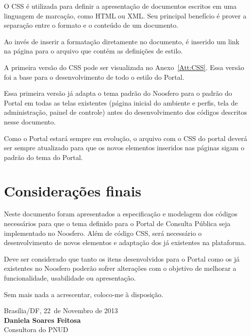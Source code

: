 \documentclass[[a4paper,11pt]{article}
\newcommand{\MyName}{Daniela Soares Feitosa}
\newcommand{\MesEntrega}{Novembro de 2013}
\newcommand{\DiaEntrega}{22}
\begin{document}
O CSS é utilizada para definir a apresentação de documentos escritos em
uma linguagem de marcação, como HTML ou XML. Seu principal benefício é
prover a separação entre o formato e o conteúdo de um documento.

Ao invés de inserir a formatação diretamente no documento, é inserido
um link na página para o arquivo que contém as definições de estilo.

A primeira versão do CSS pode ser visualizada no
Anexo~\ref{Att:CSS}. Essa versão foi a base para o
desenvolvimento de todo o estilo do Portal.

Essa primeira versão já adapta o tema padrão do Noosfero para o padrão
do Portal em todas as telas existentes (página inicial do ambiente e
perfis, tela de administração, painel de controle) antes do desenvolvimento dos
códigos descritos nesse documento.

Como o Portal estará sempre em evolução, o arquivo com o CSS do
portal deverá ser sempre atualizado para que os novos elementos
inseridos nas páginas sigam o padrão do tema do Portal.

\newpage

\section{Considerações finais}

Neste documento foram apresentados a especificação e modelagem
dos
códigos necessários para que o tema definido para o Portal de Consulta
Pública seja implementado no Noosfero. Além de código CSS, será
necessário o desenvolvimento de novos elementos e adaptação dos
já existentes na plataforma.

Deve ser considerado que tanto os itens
desenvolvidos para o Portal como os já existentes no Noosfero
poderão sofrer alterações com o objetivo de melhorar a
funcionalidade, usabilidade ou apresentação.

\vspace{1cm}

Sem mais nada a acrescentar, coloco-me à disposição.

\vspace{1cm}

\begin{minipage}{\textwidth}
  Brasília/DF, \DiaEntrega \ de \MesEntrega\\[1cm]
  \textbf{\MyName}\\
  \small Consultora do PNUD
\end{minipage}

\newpage
\appendix
\appendixpage

\end{document}
